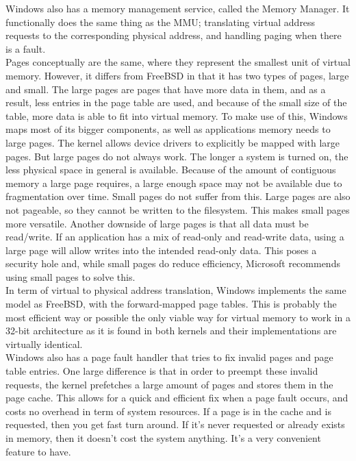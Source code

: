 \documentclass[titlepage]{article}
\begin{document}
\begin{singlespace}
 


Windows also has a memory management service, called the Memory Manager. It functionally does the same thing as the MMU; translating virtual address requests to the corresponding physical address, and handling paging when there is a fault. \\
    Pages conceptually are the same, where they represent the smallest unit of virtual memory. However, it differs from FreeBSD in that it has two types of pages, large and small. The large pages are pages that have more data in them, and as a result, less entries in the page table are used, and because of the small size of the table, more data is able to fit into virtual memory. To make use of this, Windows maps most of its bigger components, as well as applications memory needs to large pages. The kernel allows device drivers to explicitly be mapped with large pages. But large pages do not always work. The longer a system is turned on, the less physical space in general is available. Because of the amount of contiguous memory a large page requires, a large enough space may not be available due to fragmentation over time. Small pages do not suffer from this. Large pages are also not pageable, so they cannot be written to the filesystem. This makes small pages more versatile. Another downside of large pages is that all data must be read/write. If an application has a mix of read-only and read-write data, using a large page will allow writes into the intended read-only data. This poses a security hole and, while small pages do reduce efficiency, Microsoft recommends using small pages to solve this.    \\
    In term of virtual to physical address translation, Windows implements the same model as FreeBSD, with the forward-mapped page tables. This is probably the most efficient way or possible the only viable way for virtual memory to work in a 32-bit architecture as it is found in both kernels and their implementations are virtually identical. \\
    Windows also has a page fault handler that tries to fix invalid pages and page table entries. One large difference is that in order to preempt these invalid requests, the kernel prefetches a large amount of pages and stores them in the page cache. This allows for a quick and efficient fix when a page fault occurs, and costs no overhead in term of system resources. If a page is in the cache and is requested, then you get fast turn around. If it's never requested or already exists in memory, then it doesn't cost the system anything. It's a very convenient feature to have. \cite{windowsch10}\\

\end{singlespace}
\end{document}
